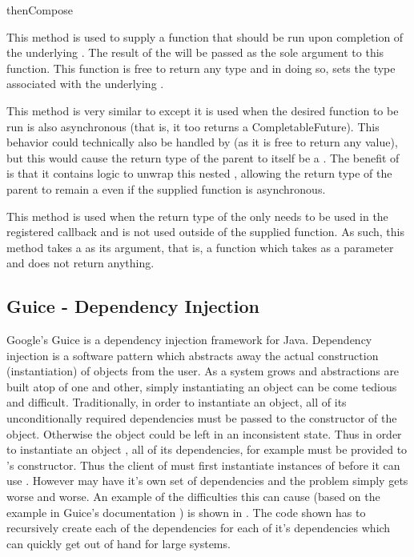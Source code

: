 \begin{labeling}{thenCompose}
	\item [thenApply] This method is used to supply a function that should be run upon completion of the underlying . The result of the  will be passed as the sole argument to this function. This function is free to return any type and in doing so, sets the type associated with the underlying . 
	\item [thenCompose] This method is very similar to  except it is used when the desired function to be run is also asynchronous (that is, it too returns a CompletableFuture). This behavior could technically also be handled by  (as it is free to return any value), but this would cause the return type of the parent  to itself be a . The benefit of  is that it contains logic to unwrap this nested , allowing the return type of the parent to remain a  even if the supplied function is asynchronous.
	\item [thenAccept] This method is used when the return type of the  only needs to be used in the registered callback and is not used outside of the supplied function. As such, this method takes a  as its argument, that is, a function which takes  as a parameter and does not return anything.  
\end{labeling}


\subsection{Guice - Dependency Injection}\label{sec:guice}
Google's Guice \cite{guice} is a dependency injection framework for Java. Dependency injection is a software pattern which abstracts away the actual construction (instantiation) of objects from the user. As a system grows and abstractions are built atop of one and other, simply instantiating an object can be come tedious and difficult. Traditionally, in order to instantiate an object, all of its unconditionally required dependencies must be passed to the constructor of the object. Otherwise the object could be left in an inconsistent state. Thus in order to instantiate an object , all of its dependencies, for example  must be provided to 's constructor. Thus the client of  must first instantiate instances of  before it can use . However  may have it's own set of dependencies and the problem simply gets worse and worse. An example of the difficulties this can cause (based on the example in Guice's documentation \cite{guiceDocs}) is shown in . The code shown has to recursively create each of the dependencies for each of it's dependencies which can quickly get out of hand for large systems.


